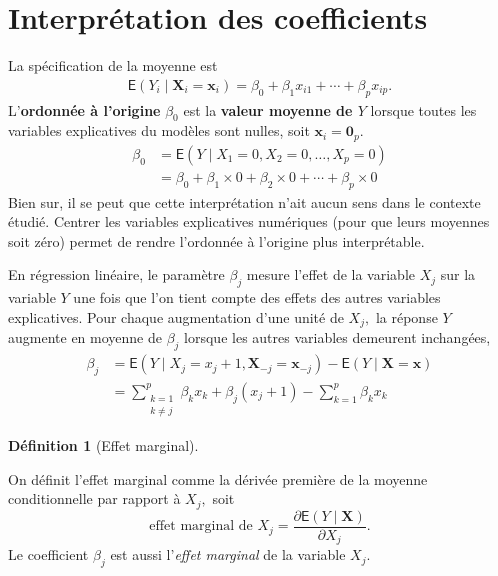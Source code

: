 \documentclass[
  11pt,
  letterpaper,
]{scrbook}
\theoremstyle{plain}
\theoremstyle{plain}
\theoremstyle{definition}
\theoremstyle{definition}
\newtheorem{definition}{Définition}[chapter]
\theoremstyle{remark}
\begin{document}
\section{Interprétation des
coefficients}\label{interpruxe9tation-des-coefficients}

La spécification de la moyenne est \begin{align*}
\mathsf{E}(Y_i \mid \boldsymbol{X}_i = \boldsymbol{x}_i) = \beta_0 + \beta_1 x_{i1} + \cdots + \beta_p x_{ip}.
\end{align*} L'\textbf{ordonnée à l'origine} \(\beta_0\) est la
\textbf{valeur moyenne de \(Y\)} lorsque toutes les variables
explicatives du modèles sont nulles, soit
\(\boldsymbol{x}_i=\boldsymbol{0}_p.\) \begin{align*}
\beta_0 &= \mathsf{E}(Y \mid X_1=0,X_2=0,\ldots,X_p=0) \\
&= \beta_0 + \beta_1 \times 0 + \beta_2 \times 0 + \cdots + \beta_p \times 0
\end{align*} Bien sur, il se peut que cette interprétation n'ait aucun
sens dans le contexte étudié. Centrer les variables explicatives
numériques (pour que leurs moyennes soit zéro) permet de rendre
l'ordonnée à l'origine plus interprétable.

En régression linéaire, le paramètre \(\beta_j\) mesure l'effet de la
variable \(X_j\) sur la variable \(Y\) une fois que l'on tient compte
des effets des autres variables explicatives. Pour chaque augmentation
d'une unité de \(X_j,\) la réponse \(Y\) augmente en moyenne de
\(\beta_j\) lorsque les autres variables demeurent inchangées,
\begin{align*}
\beta_j &= \mathsf{E}(Y \mid X_j= x_j+1, \boldsymbol{X}_{-j} = \boldsymbol{x}_{-j})  - \mathsf{E}(Y \mid \boldsymbol{X} = \boldsymbol{x}) \\
&= \sum_{\substack{k=1\\k \neq j}}^p \beta_kx_k + \beta_j(x_j+1) - \sum_{k=1}^p \beta_k x_k
\end{align*}

\begin{definition}[Effet
marginal]\protect\hypertarget{def-effet-marginal}{}\label{def-effet-marginal}

On définit l'effet marginal comme la dérivée première de la moyenne
conditionnelle par rapport à \(X_j,\) soit
\[\text{effet marginal de }X_j =  \frac{\partial \mathsf{E}(Y \mid \boldsymbol{X})}{ \partial X_j}.\]
Le coefficient \(\beta_j\) est aussi l'\emph{effet marginal} de la
variable \(X_j.\)

\end{definition}
\end{document}
